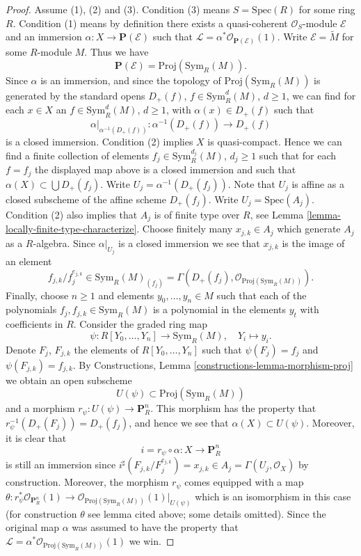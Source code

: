 \begin{proof}
Assume (1), (2) and (3).
Condition (3) means $S = \text{Spec}(R)$ for some ring $R$.
Condition (1) means by definition
there exists a quasi-coherent $\mathcal{O}_S$-module
$\mathcal{E}$ and an immersion $\alpha : X \to \mathbf{P}(\mathcal{E})$
such that $\mathcal{L} = \alpha^*\mathcal{O}_{\mathbf{P}(\mathcal{E})}(1)$.
Write $\mathcal{E} = \widetilde{M}$ for some $R$-module $M$.
Thus we have
$$
\mathbf{P}(\mathcal{E}) = \text{Proj}(\text{Sym}_R(M)).
$$
Since $\alpha$ is an immersion, and since the topology of
$\text{Proj}(\text{Sym}_R(M))$ is generated by the standard
opens $D_{+}(f)$, $f \in \text{Sym}_R^d(M)$, $d \geq 1$,
we can find for each $x \in X$ an
$f \in \text{Sym}_R^d(M)$, $d \geq 1$, with $\alpha(x) \in D_{+}(f)$
such that
$$
\alpha|_{\alpha^{-1}(D_{+}(f))} : \alpha^{-1}(D_{+}(f)) \to D_{+}(f)
$$
is a closed immersion. 
Condition (2) implies $X$ is quasi-compact. Hence we can find
a finite collection of elements
$f_j \in \text{Sym}_R^{d_j}(M)$, $d_j \geq 1$
such that for each $f = f_j$ the displayed map above
is a closed immersion and such that $\alpha(X) \subset \bigcup D_{+}(f_j)$.
Write $U_j = \alpha^{-1}(D_{+}(f_j))$. Note that $U_j$ is affine
as a closed subscheme of the affine scheme $D_{+}(f_j)$.
Write $U_j = \text{Spec}(A_j)$. Condition (2) also implies that
$A_j$ is of finite type over $R$, see
Lemma \ref{lemma-locally-finite-type-characterize}.
Choose finitely many $x_{j, k} \in A_j$ which
generate $A_j$ as a $R$-algebra. Since $\alpha|_{U_j}$ is a closed
immersion we see that $x_{j, k}$ is the image of an element
$$
f_{j, k}/f_j^{e_{j, k}} \in \text{Sym}_R(M)_{(f_j)}
=
\Gamma(D_{+}(f_j), \mathcal{O}_{\text{Proj}(\text{Sym}_R(M))}).
$$
Finally, choose $n \geq 1$ and elements $y_0, \ldots, y_n \in M$ such that each
of the polynomials $f_j, f_{j, k} \in \text{Sym}_R(M)$ is a polynomial
in the elements $y_t$ with coefficients in $R$.
Consider the graded ring map
$$
\psi : R[Y_0, \ldots, Y_n] \longrightarrow \text{Sym}_R(M),
\quad Y_i \longmapsto y_i.
$$
Denote $F_j$, $F_{j, k}$ the elements of $R[Y_0, \ldots, Y_n]$ such
that $\psi(F_j) = f_j$ and $\psi(F_{j, k}) = f_{j, k}$.
By Constructions, Lemma \ref{constructions-lemma-morphism-proj}
we obtain an open subscheme
$$
U(\psi) \subset \text{Proj}(\text{Sym}_R(M))
$$
and a morphism
$r_\psi : U(\psi) \to \mathbf{P}^n_R$. This morphism
has the property that
$r_\psi^{-1}(D_{+}(F_j)) = D_{+}(f_j)$, and hence we see
that $\alpha(X) \subset U(\psi)$. Moreover, it is clear
that
$$
i = r_\psi \circ \alpha : X \longrightarrow \mathbf{P}^n_R
$$
is still an immersion since
$i^\sharp(F_{j, k}/F_j^{e_{j, k}}) = x_{j, k} \in
A_j = \Gamma(U_j, \mathcal{O}_X)$
by construction. Moreover, the morphism $r_\psi$ comes
equipped with a map
$\theta : r_\psi^*\mathcal{O}_{\mathbf{P}^n_R}(1)
\to \mathcal{O}_{\text{Proj}(\text{Sym}_R(M))}(1)|_{U(\psi)}$
which is an isomorphism in this case (for construction $\theta$
see lemma cited above; some details omitted).
Since the original map $\alpha$ was assumed to have the 
property that
$\mathcal{L} = \alpha^*\mathcal{O}_{\text{Proj}(\text{Sym}_R(M))}(1)$
we win.
\end{proof}

